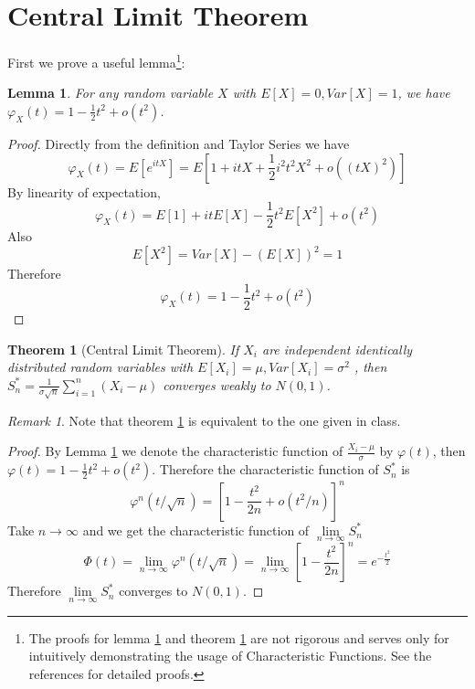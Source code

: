 \documentclass{article}
\theoremstyle{definition}
\theoremstyle{plain}
\newtheorem{theorem}{Theorem}[section]
\newtheorem{lemma}{Lemma}[section]
\theoremstyle{remark}
\newtheorem*{remark}{Remark}
\begin{document}
\section{Central Limit Theorem}
First we prove a useful lemma\footnote{The proofs for lemma \ref{lem:clt} and theorem \ref{thm:clt} are not rigorous and serves only for intuitively demonstrating the usage of Characteristic Functions. See the references\cite{waterloo,nus} for detailed proofs.}:
\begin{lemma}
	For any random variable $X$ with $E[X]=0,Var[X]=1$, we have $\varphi_X(t)=1-\frac12t^2+o(t^2)$.
	\label{lem:clt}
\end{lemma}
\begin{proof}
	Directly from the definition and Taylor Series we have
	$$\varphi_X(t)=E[e^{itX}]=E[1+itX+\frac12i^2t^2X^2+o((tX)^2)]$$
	By linearity of expectation,
	$$\varphi_X(t)=E[1]+itE[X]-\frac12t^2E[X^2]+o(t^2)$$
	Also
	$$E[X^2]=Var[X]-(E[X])^2=1$$
	Therefore $$\varphi_X(t)=1-\frac12t^2+o(t^2)$$
\end{proof}
\begin{theorem}[Central Limit Theorem\cite{waterloo}]
	If $X_i$ are independent identically distributed random variables with $E[X_i] = \mu, Var[X_i] = \sigma^2$ , then $S_n^* = \frac1{\sigma\sqrt n}\sum_{i=1}^n(X_i-\mu)$ converges weakly to $N(0, 1)$.
	\label{thm:clt}
\end{theorem}
\begin{remark}
	Note that theorem \ref{thm:clt} is equivalent to the one given in class.
\end{remark}
\begin{proof}
	By Lemma \ref{lem:clt} we denote the characteristic function of $\frac{X_i-\mu}{\sigma}$ by $\varphi(t)$, then  $\varphi(t)=1-\frac12t^2+o(t^2)$. Therefore the characteristic function of $S_n^*$ is 
	$$\varphi^n(t/\sqrt{n})=[1-\frac{t^2}{2n}+o(t^2/n)]^n$$
	Take $n\to\infty$ and we get the characteristic function of $\lim\limits_{n\to\infty}S^*_n$
	$$\varPhi(t)=\lim\limits_{n\to\infty}\varphi^n(t/\sqrt{n})
	=\lim\limits_{n\to\infty}[1-\frac{t^2}{2n}]^n=e^{-\frac{t^2}2}$$
	Therefore $\lim\limits_{n\to\infty}S_n^*$ converges to $N(0,1)$.
\end{proof}
\medskip



\end{document}
